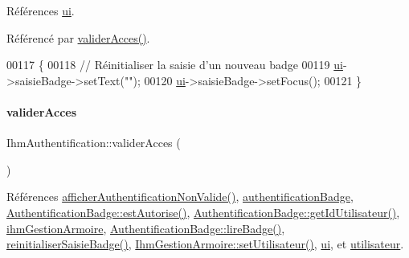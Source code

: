 Références \hyperlink{class_ihm_authentification_a2bab782e7f65474f2817c3916ded9d18}{ui}.



Référencé par \hyperlink{class_ihm_authentification_ad62f646310fff597d3bf50af2c3d5d0c}{valider\+Acces()}.


\begin{DoxyCode}
00117 \{
00118     \textcolor{comment}{// Réinitialiser la saisie d'un nouveau badge}
00119     \hyperlink{class_ihm_authentification_a2bab782e7f65474f2817c3916ded9d18}{ui}->saisieBadge->setText(\textcolor{stringliteral}{""});
00120     \hyperlink{class_ihm_authentification_a2bab782e7f65474f2817c3916ded9d18}{ui}->saisieBadge->setFocus();
00121 \}
\end{DoxyCode}
\mbox{\label{class_ihm_authentification_ad62f646310fff597d3bf50af2c3d5d0c}} 
\paragraph{\texorpdfstring{valider\+Acces}{validerAcces}}
{\footnotesize\ttfamily Ihm\+Authentification\+::valider\+Acces (\begin{DoxyParamCaption}{ }\end{DoxyParamCaption})\hspace{0.3cm}{\ttfamily [slot]}}



Références \hyperlink{class_ihm_authentification_a91a8934658e317870fb6b931608824db}{afficher\+Authentification\+Non\+Valide()}, \hyperlink{class_ihm_authentification_ac257a02215ec8d5d31e5a1def0c0e86d}{authentification\+Badge}, \hyperlink{class_authentification_badge_aceb9c5a09dddbff73cd02973913c79c1}{Authentification\+Badge\+::est\+Autorise()}, \hyperlink{class_authentification_badge_ae8c755b184c20626d4362d5e4739dfe1}{Authentification\+Badge\+::get\+Id\+Utilisateur()}, \hyperlink{class_ihm_authentification_a6ce06a3dbea8b929c3ddffdba011c01f}{ihm\+Gestion\+Armoire}, \hyperlink{class_authentification_badge_a77488a375465873bfe6ab62f53abea6d}{Authentification\+Badge\+::lire\+Badge()}, \hyperlink{class_ihm_authentification_afa429a3de1da16117b7ce4c9d8f40160}{reinitialiser\+Saisie\+Badge()}, \hyperlink{class_ihm_gestion_armoire_af63a0c4424edd90a3c45506dde527b4e}{Ihm\+Gestion\+Armoire\+::set\+Utilisateur()}, \hyperlink{class_ihm_authentification_a2bab782e7f65474f2817c3916ded9d18}{ui}, et \hyperlink{class_ihm_authentification_ad08cee96c59182c27198907491f0c963}{utilisateur}.



